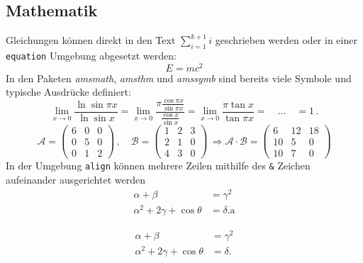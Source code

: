 \subsection{Mathematik}
\label{subsec:Mathematik}
Gleichungen können direkt in den Text $\sum_{i=1}^{k+1}i$ geschrieben werden oder in einer \verb"equation" Umgebung abgesetzt werden:
\begin{equation}
E=mc^2 \label{eq:einstein}
\end{equation}
In den Paketen \textit{amsmath}, \textit{amsthm} und \textit{amssymb} sind bereits viele Symbole und typische Ausdrücke definiert:
\begin{equation}
\label{eq:abg}
\lim_{x \to 0} \frac{\ln \sin \pi x}{\ln \sin x} = 
     \lim_{x \to 0} \frac{\pi \frac{\cos \pi x}{\sin \pi x} }{ \frac{\cos x}{\sin x} } =
     \lim_{x \to 0} \frac{\pi \tan x}{\tan \pi x} = \quad \ldots \quad = 1 \, .
\end{equation}
\begin{equation}
\label{eq:matrix}
\mathcal{A} = \left( \begin{array}{ccc} 6 & 0 & 0 \\ 0 & 5 & 0 \\ 0 & 1 & 2 \end{array} \right)\, , \quad
\mathcal{B} = \left( \begin{array}{ccc} 1 & 2 & 3 \\ 2 & 1 & 0 \\ 4 & 3 & 0 \end{array} \right)\, \Rightarrow
\mathcal{A} \cdot \mathcal{B} = \left( \begin{array}{ccc} 6 & 12 & 18 \\ 10 & 5 & 0 \\ 10 & 7 & 0 \end{array} \right)
\end{equation}
In der Umgebung \verb"align" können mehrere Zeilen mithilfe des \verb"&" Zeichen aufeinander ausgerichtet werden
\begin{align}
\alpha + \beta &=\gamma^2 \\
\alpha^2 + 2\gamma + \cos\theta &= \delta. \mathrm{a}\label{eq:erstesBsp} 
\end{align}

\begin{align}
\alpha + \beta &=\gamma^2 \\
\alpha^2 + 2\gamma + \cos\theta &= \delta.\label{eq:zweitesBsp} 
\end{align}


